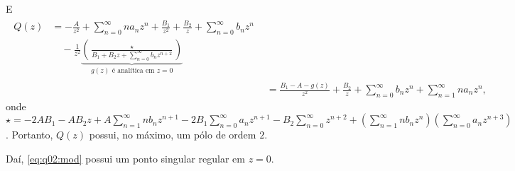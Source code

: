 \documentclass[a4paper,12pt, leqno, answers]{exam}
\begin{document}
\begin{questions}
\begin{parts}
\begin{solution}
            E
            \begin{align*}
                \begin{split}
                    Q(z) &= -\frac{A}{z^2} + \sum_{n = 0}^\infty n a_n z^n + \frac{B_1}{z^2} + \frac{B_2}{z} + \sum_{n = 0}^\infty b_n z^n \\
                    & \quad - \frac{1}{z^2} \underbrace{\left( \frac{\star}{B_1 + B_2 z + \sum_{n = 0}^\infty b_n z^{n + 2}} \right)}_{g(z) \text{ \'{e} anal\'{i}tica em } z = 0} 
                \end{split} \\
                &= \frac{B_1 - A - g(z)}{z^2} + \frac{B_2}{z} + \sum_{n = 0}^\infty b_n z^n + \sum_{n = 1}^\infty n a_n z^n,
            \end{align*}
            onde $\star = -2A B_1 - A B_2 z + A \sum_{n = 1}^\infty n b_n z^{n + 1} - 2 B_1 \sum_{n = 0}^\infty a_n z^{n + 1} - B_2 \sum_{n = 0}^\infty z^{n + 2} + \left( \sum_{n = 1}^\infty n b_n z^n \right) \left( \sum_{n = 0}^\infty a_n z^{n + 3} \right)$. Portanto, $Q(z)$ possui, no m\'{a}ximo, um p\'{o}lo de ordem $2$.

            Da\'{i}, \eqref{eq:q02:mod} possui um ponto singular regular em $z = 0$.
        \end{solution}


\end{parts}
\end{questions}
\end{document}
